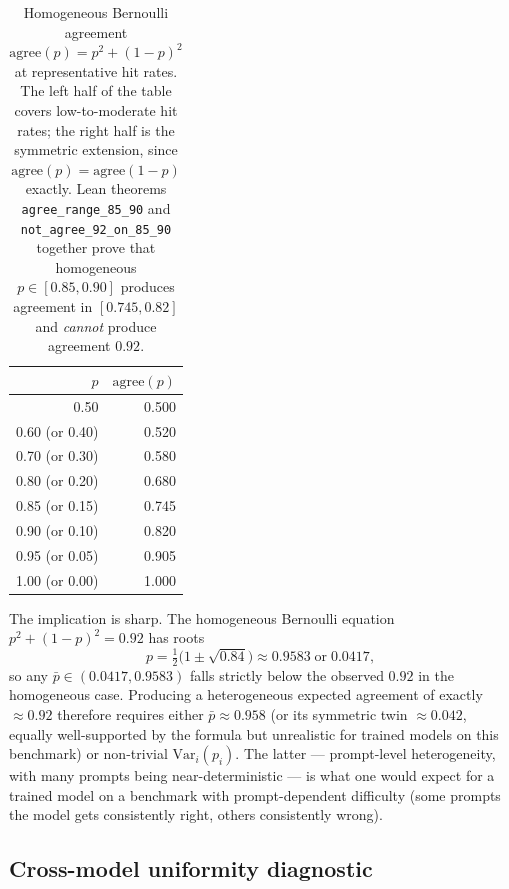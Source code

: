 \documentclass[11pt]{article}
\begin{document}
\begin{table}[htbp]
\centering
\small
\caption{Homogeneous Bernoulli agreement
  $\text{agree}(p) = p^2 + (1-p)^2$ at representative hit rates.
The left half of the table covers low-to-moderate hit rates; the
  right half is the symmetric extension, since $\text{agree}(p)
  = \text{agree}(1-p)$ exactly.
Lean theorems \texttt{agree\_range\_85\_90} and
  \texttt{not\_agree\_92\_on\_85\_90} together prove that
  homogeneous $p \in [0.85, 0.90]$ produces agreement in
  $[0.745, 0.82]$ and \emph{cannot} produce agreement $0.92$.}
\label{tab:tr-agree-values}
\begin{tabular}{rr}
\toprule
$p$ & $\text{agree}(p)$ \\
\midrule
0.50 & 0.500 \\
0.60 (or 0.40) & 0.520 \\
0.70 (or 0.30) & 0.580 \\
0.80 (or 0.20) & 0.680 \\
0.85 (or 0.15) & 0.745 \\
0.90 (or 0.10) & 0.820 \\
0.95 (or 0.05) & 0.905 \\
1.00 (or 0.00) & 1.000 \\
\bottomrule
\end{tabular}
\end{table}

The implication is sharp.
The homogeneous Bernoulli equation $p^2 + (1-p)^2 = 0.92$ has roots
\[
  p = \tfrac{1}{2}\bigl(1 \pm \sqrt{0.84}\bigr)
    \approx 0.9583 \;\text{or}\; 0.0417,
\]
so any $\bar p \in (0.0417, 0.9583)$ falls strictly below the
  observed $0.92$ in the homogeneous case.
Producing a heterogeneous expected agreement of exactly $\approx 0.92$
  therefore requires either $\bar p \approx 0.958$ (or its symmetric
  twin $\approx 0.042$, equally well-supported by the formula but
  unrealistic for trained models on this benchmark) or non-trivial
  $\mathrm{Var}_i(p_i)$.
The latter --- prompt-level heterogeneity, with many prompts being
  near-deterministic --- is what one would expect for a trained model
  on a benchmark with prompt-dependent difficulty
  (some prompts the model gets consistently right, others
  consistently wrong).

\subsection{Cross-model uniformity diagnostic}
\label{sec:tr-case-c-uniformity}
\end{document}
